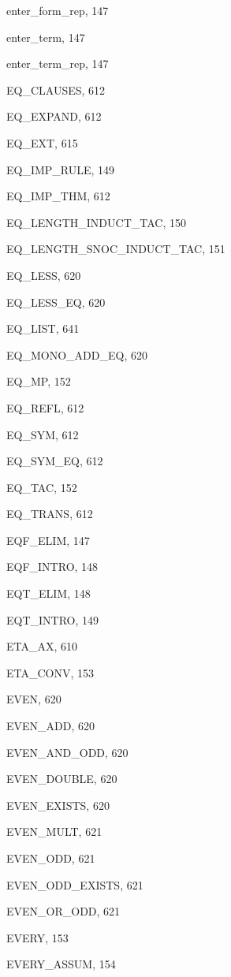 \begin{theindex}
  \item {\ptt enter\_form\_rep}, 147
  \item {\ptt enter\_term}, 147
  \item {\ptt enter\_term\_rep}, 147
  \item {\ptt EQ\_CLAUSES}, 612
  \item {\ptt EQ\_EXPAND}, 612
  \item {\ptt EQ\_EXT}, 615
  \item {\ptt EQ\_IMP\_RULE}, 149
  \item {\ptt EQ\_IMP\_THM}, 612
  \item {\ptt EQ\_LENGTH\_INDUCT\_TAC}, 150
  \item {\ptt EQ\_LENGTH\_SNOC\_INDUCT\_TAC}, 151
  \item {\ptt EQ\_LESS}, 620
  \item {\ptt EQ\_LESS\_EQ}, 620
  \item {\ptt EQ\_LIST}, 641
  \item {\ptt EQ\_MONO\_ADD\_EQ}, 620
  \item {\ptt EQ\_MP}, 152
  \item {\ptt EQ\_REFL}, 612
  \item {\ptt EQ\_SYM}, 612
  \item {\ptt EQ\_SYM\_EQ}, 612
  \item {\ptt EQ\_TAC}, 152
  \item {\ptt EQ\_TRANS}, 612
  \item {\ptt EQF\_ELIM}, 147
  \item {\ptt EQF\_INTRO}, 148
  \item {\ptt EQT\_ELIM}, 148
  \item {\ptt EQT\_INTRO}, 149
  \item {\ptt ETA\_AX}, 610
  \item {\ptt ETA\_CONV}, 153
  \item {\ptt EVEN}, 620
  \item {\ptt EVEN\_ADD}, 620
  \item {\ptt EVEN\_AND\_ODD}, 620
  \item {\ptt EVEN\_DOUBLE}, 620
  \item {\ptt EVEN\_EXISTS}, 620
  \item {\ptt EVEN\_MULT}, 621
  \item {\ptt EVEN\_ODD}, 621
  \item {\ptt EVEN\_ODD\_EXISTS}, 621
  \item {\ptt EVEN\_OR\_ODD}, 621
  \item {\ptt EVERY}, 153
  \item {\ptt EVERY\_ASSUM}, 154

\end{theindex}
